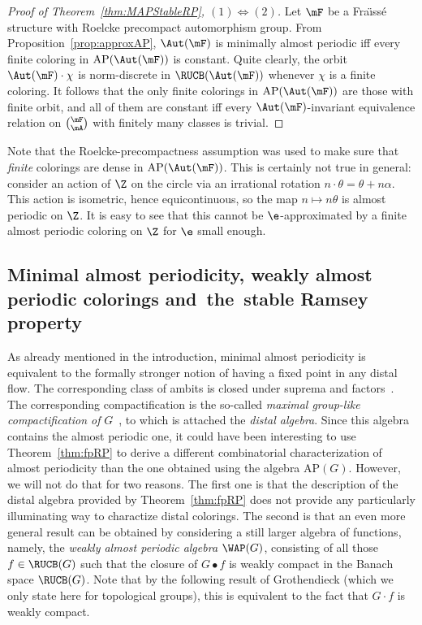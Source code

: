 \begin{proof}[Proof of Theorem~\ref{thm:MAPStableRP}, $(1) \Leftrightarrow (2)$]
Let $\mF$ be a Fra\"{\i}ss\'e structure with Roelcke precompact automorphism group. From Proposition~\ref{prop:approxAP}, $\Aut(\mF)$ is minimally almost periodic iff every finite coloring in $\mathrm{AP}(\Aut(\mF))$ is constant. Quite clearly, the orbit $\Aut(\mF)\cdot \chi$ is norm-discrete in $\RUCB(\Aut(\mF))$ whenever $\chi$ is a finite coloring. It follows that the only finite colorings in $\mathrm{AP}(\Aut(\mF))$ are those with finite orbit, and all of them are constant iff every $\Aut(\mF)$-invariant equivalence relation on $\binom{\mF}{\mA}$ with finitely many classes is trivial.
\end{proof}

Note that the Roelcke-precompactness assumption was used to make sure that \emph{finite} colorings are dense in $\mathrm{AP}(\Aut(\mF))$. This is certainly not true in general: consider an action of $\Z$ on the circle via an irrational rotation $n\cdot \theta = \theta + n\alpha$. This action is isometric, hence equicontinuous, so the map $n\mapsto n\theta$ is almost periodic on $\Z$. It is easy to see that this cannot be $\e$-approximated by a finite almost periodic coloring on $\Z$ for $\e$ small enough.

\subsection{Minimal almost periodicity, weakly almost periodic colorings and~the~stable Ramsey property}
\label{subsection:WAP}

As already mentioned in the introduction, minimal almost periodicity is equivalent to the formally stronger notion of having a fixed point in any distal flow. The corresponding class of ambits is closed under suprema and factors~\cite[Chapter~IV, Section~2.27]{dV}. The corresponding compactification is the so-called \emph{maximal group-like compactification of} $G$~\cite[Chapter~IV, Section~6.18]{dV}, to which is attached the \emph{distal algebra}. Since this algebra contains the almost periodic one, it could have been interesting to use Theorem~\ref{thm:fpRP} to derive a different combinatorial characterization of almost periodicity than the one obtained using the algebra $\mathrm{AP}(G)$. However, we will not do that for two reasons. The first one is that the description of the distal algebra provided by Theorem~\ref{thm:fpRP} does not provide any particularly illuminating way to charactize distal colorings. The second is that an even more general result can be obtained by considering a still larger algebra of functions, namely, the \emph{weakly almost periodic algebra} $\WAP(G)$, consisting of all those $f\in \RUCB(G)$ such that the closure of $G\bullet f$ is weakly compact in the Banach space $\RUCB(G)$. Note that by the following result of Grothendieck (which we only state here for topological groups), this is equivalent to the fact that $G\cdot f$ is weakly compact.

